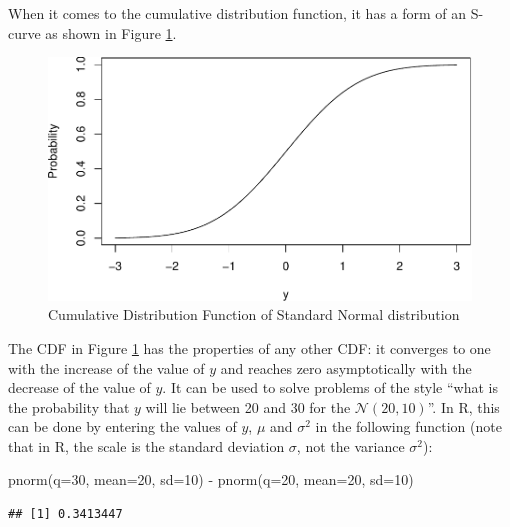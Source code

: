 \documentclass[
]{book}
\newenvironment{Shaded}{\begin{snugshade}}{\end{snugshade}}
\newcommand{\AttributeTok}[1]{\textcolor[rgb]{0.77,0.63,0.00}{#1}}
\newcommand{\DecValTok}[1]{\textcolor[rgb]{0.00,0.00,0.81}{#1}}
\newcommand{\FunctionTok}[1]{\textcolor[rgb]{0.00,0.00,0.00}{#1}}
\newcommand{\NormalTok}[1]{#1}
\newcommand{\SpecialCharTok}[1]{\textcolor[rgb]{0.00,0.00,0.00}{#1}}
\theoremstyle{definition}
\theoremstyle{definition}
\theoremstyle{definition}
\theoremstyle{definition}
\theoremstyle{remark}
\begin{document}
When it comes to the cumulative distribution function, it has a form of an S-curve as shown in Figure \ref{fig:pnormPlot}.

\begin{figure}
\centering
\includegraphics{Svetunkov---Statistics-for-Business-Analytics_files/figure-latex/pnormPlot-1.pdf}
\caption{\label{fig:pnormPlot}Cumulative Distribution Function of Standard Normal distribution}
\end{figure}

The CDF in Figure \ref{fig:pnormPlot} has the properties of any other CDF: it converges to one with the increase of the value of \(y\) and reaches zero asymptotically with the decrease of the value of \(y\). It can be used to solve problems of the style ``what is the probability that \(y\) will lie between 20 and 30 for the \(\mathcal{N}(20, 10)\)''. In R, this can be done by entering the values of \(y\), \(\mu\) and \(\sigma^2\) in the following function (note that in R, the scale is the standard deviation \(\sigma\), not the variance \(\sigma^2\)):

\begin{Shaded}
\begin{Highlighting}[]
\FunctionTok{pnorm}\NormalTok{(}\AttributeTok{q=}\DecValTok{30}\NormalTok{, }\AttributeTok{mean=}\DecValTok{20}\NormalTok{, }\AttributeTok{sd=}\DecValTok{10}\NormalTok{) }\SpecialCharTok{{-}} \FunctionTok{pnorm}\NormalTok{(}\AttributeTok{q=}\DecValTok{20}\NormalTok{, }\AttributeTok{mean=}\DecValTok{20}\NormalTok{, }\AttributeTok{sd=}\DecValTok{10}\NormalTok{)}
\end{Highlighting}
\end{Shaded}

\begin{verbatim}
## [1] 0.3413447
\end{verbatim}
\end{document}
